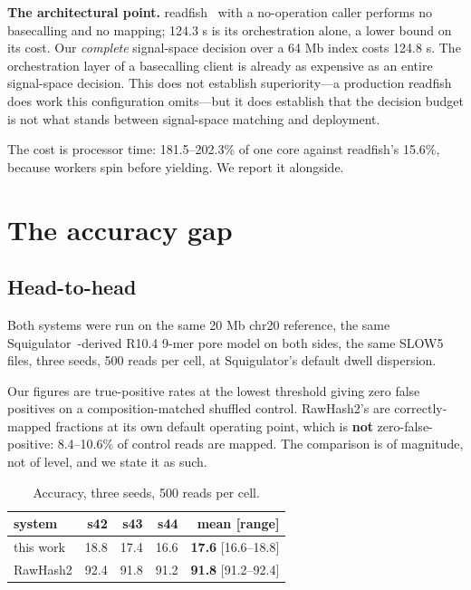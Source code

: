 \documentclass[runningheads]{llncs}
\begin{document}
\textbf{The architectural point.} readfish~\cite{readfish} with a no-operation caller
performs no basecalling
and no mapping; 124.3 \textmu{}s is its orchestration alone, a lower bound on its cost. Our
\emph{complete} signal-space decision over a 64 Mb index costs 124.8 \textmu{}s. The orchestration layer
of a basecalling client is already as expensive as an entire signal-space decision. This does
not establish superiority---a production readfish does work this configuration omits---but it
does establish that the decision budget is not what stands between signal-space matching and
deployment.

The cost is processor time: 181.5--202.3\% of one core against readfish's 15.6\%, because
workers spin before yielding. We report it alongside.

\section{The accuracy gap}
\label{sec:gap}

\subsection{Head-to-head}

Both systems were run on the same 20 Mb chr20 reference, the same
Squigulator~\cite{squigulator}-derived R10.4
9-mer pore model on both sides, the same SLOW5 files, three seeds, 500 reads per cell, at
Squigulator's default dwell dispersion.

Our figures are true-positive rates at the lowest threshold giving zero false positives on a
composition-matched shuffled control. RawHash2's are correctly-mapped fractions at its own
default operating point, which is \textbf{not} zero-false-positive: 8.4--10.6\% of control reads
are mapped. The comparison is of magnitude, not of level, and we state it as such.

\begin{table}[t]
\caption{Accuracy, three seeds, 500 reads per cell.}
\label{tab:acc}
\centering
\footnotesize
\begin{tabular}{lrrrr}
\toprule
system & s42 & s43 & s44 & mean [range] \\
\midrule
this work  & 18.8 & 17.4 & 16.6 & \textbf{17.6} [16.6--18.8] \\
RawHash2   & 92.4 & 91.8 & 91.2 & \textbf{91.8} [91.2--92.4] \\
\bottomrule
\end{tabular}
\end{table}
\end{document}
